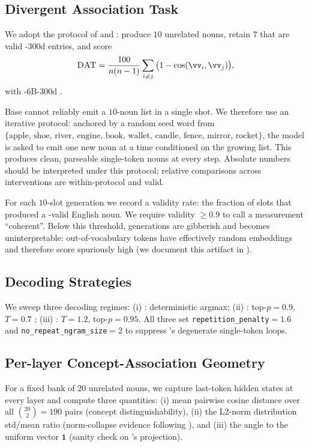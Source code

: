 \subsection{Divergent Association Task}
\label{sec:method:dat}

We adopt the \dat protocol of \citet{olson2021naming} and
\citet{chen2023probing}: produce $10$ unrelated nouns, retain $7$ that are
valid \glove-300d entries, and score
\[
\dat = \frac{100}{n(n-1)} \sum_{i\neq j} \big(1 - \cos(\vv_i, \vv_j)\big),
\]
with \glove-6B-300d \citep{pennington2014glove}.

Base \gptsmall cannot reliably emit a $10$-noun list in a single shot. We
therefore use an iterative protocol: anchored by a random seed word from
$\{\text{apple, shoe, river, engine, book, wallet, candle, fence, mirror,
rocket}\}$, the model is asked to emit one new noun at a time conditioned on
the growing list. This produces clean, parseable single-token nouns at every
step. Absolute \dat numbers should be interpreted under this protocol;
relative comparisons across interventions are within-protocol and valid.

For each $10$-slot generation we record a validity rate: the fraction of
slots that produced a \glove-valid English noun. We require validity
$\ge 0.9$ to call a measurement ``coherent''. Below this threshold,
generations are gibberish and \dat becomes uninterpretable: out-of-vocabulary
tokens have effectively random \glove embeddings and therefore score
spuriously high (we document this artifact in ).

\subsection{Decoding Strategies}
\label{sec:method:decoding}

We sweep three decoding regimes:
(i) \greedy: deterministic argmax;
(ii) \topp: top-$p{=}0.9$, $T{=}0.7$ \citep{holtzman2020curious};
(iii) \hight: $T{=}1.2$, top-$p{=}0.95$.
All three set \verb|repetition_penalty|$=1.6$ and
\verb|no_repeat_ngram_size|$=2$ to suppress \gptsmall's degenerate
single-token loops.

\subsection{Per-layer Concept-Association Geometry}
\label{sec:method:geometry}

For a fixed bank of $20$ unrelated nouns, we capture last-token hidden states
at every layer and compute three quantities: (i) mean pairwise cosine
distance over all $\binom{20}{2}=190$ pairs (concept distinguishability),
(ii) the L2-norm distribution std/mean ratio (norm-collapse evidence
following \citet{gupta2024geometric}), and (iii) the angle to the uniform
vector $\bm{1}$ (sanity check on \layernorm's projection).

